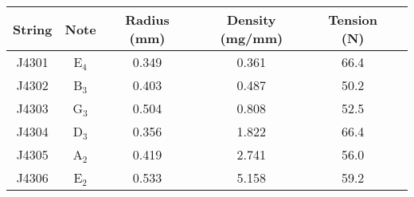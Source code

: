 \begin{tabular}{cccccc}
\toprule
String & Note & Radius (mm) & Density (mg/mm) & Tension (N) \\
\midrule
J4301 & E$_{4}$ & 0.349 & 0.361 & 66.4 \\
J4302 & B$_{3}$ & 0.403 & 0.487 & 50.2 \\
J4303 & G$_{3}$ & 0.504 & 0.808 & 52.5 \\
J4304 & D$_{3}$ & 0.356 & 1.822 & 66.4 \\
J4305 & A$_{2}$ & 0.419 & 2.741 & 56.0 \\
J4306 & E$_{2}$ & 0.533 & 5.158 & 59.2 \\
\bottomrule
\end{tabular}

